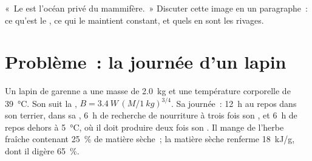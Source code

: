 \begin{exercise}[$\star\star\star$]\label{exo:b1:mammal-organization:12}
«~Le  est l'océan privé du mammifère.~» Discuter cette
image en un paragraphe~: ce qu'est le , ce qui le
maintient constant, et quels  en sont les rivages.
\end{exercise}

\section{Problème~: la journée d'un lapin}

\begin{problem}
\label{pb:b1:mammal-organization:1}
Un lapin de garenne a une masse de \qty{2.0}{kg} et une température
corporelle de \qty{39}{\celsius}. Son  suit la , $B = \qty{3.4}{W}\,(M/\qty{1}{kg})^{3/4}$. Sa journée~:
\qty{12}{h} au repos dans son terrier, dans sa , \qty{6}{h} de recherche de nourriture à trois fois son
, et \qty{6}{h} de repos dehors à \qty{5}{\celsius}, où
il doit produire deux fois son . Il mange de l'herbe
fraîche contenant \qty{25}{\%} de matière sèche~; la matière sèche
renferme \qty{18}{kJ/g}, dont il digère \qty{65}{\%}.


\end{problem}
